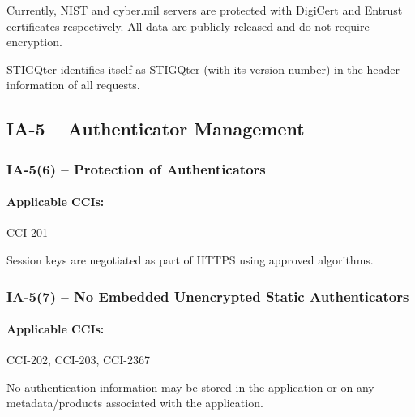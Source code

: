 \documentclass[letterpaper, 10pt, twoside]{article}
\begin{document}
Currently, NIST and cyber.mil servers are protected with DigiCert and Entrust certificates respectively. All data are publicly released and do not require encryption.

STIGQter identifies itself as STIGQter (with its version number) in the header information of all requests.

\subsection{IA-5 -- Authenticator Management}

\subsubsection{IA-5(6) -- Protection of Authenticators}

\paragraph{Applicable CCIs:} CCI-201

Session keys are negotiated as part of HTTPS using approved algorithms.

\subsubsection{IA-5(7) -- No Embedded Unencrypted Static Authenticators}

\paragraph{Applicable CCIs:} CCI-202, CCI-203, CCI-2367

No authentication information may be stored in the application or on any metadata/products associated with the application.

\clearpage
\printbibliography
\end{document}
